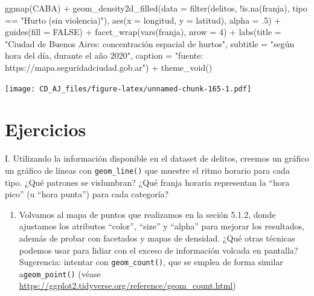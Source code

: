 \documentclass[
]{book}
\newenvironment{Shaded}{\begin{snugshade}}{\end{snugshade}}
\newcommand{\AttributeTok}[1]{\textcolor[rgb]{0.77,0.63,0.00}{#1}}
\newcommand{\ConstantTok}[1]{\textcolor[rgb]{0.00,0.00,0.00}{#1}}
\newcommand{\DecValTok}[1]{\textcolor[rgb]{0.00,0.00,0.81}{#1}}
\newcommand{\FunctionTok}[1]{\textcolor[rgb]{0.00,0.00,0.00}{#1}}
\newcommand{\NormalTok}[1]{#1}
\newcommand{\SpecialCharTok}[1]{\textcolor[rgb]{0.00,0.00,0.00}{#1}}
\newcommand{\StringTok}[1]{\textcolor[rgb]{0.31,0.60,0.02}{#1}}
\providecommand{\tightlist}{%
  \setlength{\itemsep}{0pt}\setlength{\parskip}{0pt}}
\begin{document}
\begin{Shaded}
\begin{Highlighting}[]
\FunctionTok{ggmap}\NormalTok{(CABA) }\SpecialCharTok{+}
    \FunctionTok{geom\_density2d\_filled}\NormalTok{(}\AttributeTok{data =} \FunctionTok{filter}\NormalTok{(delitos, }\SpecialCharTok{!}\FunctionTok{is.na}\NormalTok{(franja), tipo }\SpecialCharTok{==} \StringTok{"Hurto (sin violencia)"}\NormalTok{),}
               \FunctionTok{aes}\NormalTok{(}\AttributeTok{x =}\NormalTok{ longitud, }\AttributeTok{y =}\NormalTok{ latitud), }\AttributeTok{alpha =}\NormalTok{ .}\DecValTok{5}\NormalTok{) }\SpecialCharTok{+}
    \FunctionTok{guides}\NormalTok{(}\AttributeTok{fill =} \ConstantTok{FALSE}\NormalTok{) }\SpecialCharTok{+}
    \FunctionTok{facet\_wrap}\NormalTok{(}\FunctionTok{vars}\NormalTok{(franja), }\AttributeTok{nrow =} \DecValTok{4}\NormalTok{) }\SpecialCharTok{+}
    \FunctionTok{labs}\NormalTok{(}\AttributeTok{title =} \StringTok{"Ciudad de Buenos Aires: concentración espacial de hurtos"}\NormalTok{,}
         \AttributeTok{subtitle =} \StringTok{"según hora del día, durante el año 2020"}\NormalTok{,}
         \AttributeTok{caption =} \StringTok{"fuente: https://mapa.seguridadciudad.gob.ar"}\NormalTok{) }\SpecialCharTok{+}
    \FunctionTok{theme\_void}\NormalTok{()}
\end{Highlighting}
\end{Shaded}

\texttt{[image: CD\_AJ\_files/figure-latex/unnamed-chunk-165-1.pdf]}

\hypertarget{ejercicios-4}{%
\section{Ejercicios}\label{ejercicios-4}}

I. Utilizando la información disponible en el dataset de delitos, creemos un gráfico un gráfico de líneas con \texttt{geom\_line()} que muestre el ritmo horario para cada tipo. ¿Qué patrones se vislumbran? ¿Qué franja horaria representan la ``hora pico'' (u ``hora punta'') para cada categoría?

\begin{enumerate}
\def\labelenumi{\Roman{enumi}.}
\setcounter{enumi}{1}
\tightlist
\item
  Volvamos al mapa de puntos que realizamos en la seción 5.1.2, donde ajustamos los atributos ``color'', ``size'' y ``alpha'' para mejorar los resultados, además de probar con facetados y mapas de densidad. ¿Qué otras técnicas podemos usar para lidiar con el exceso de información volcada en pantalla? Sugerencia: intentar con \texttt{geom\_count()}, que se emplea de forma similar a\texttt{geom\_point()} (véase \url{https://ggplot2.tidyverse.org/reference/geom_count.html})
\end{enumerate}
\end{document}
